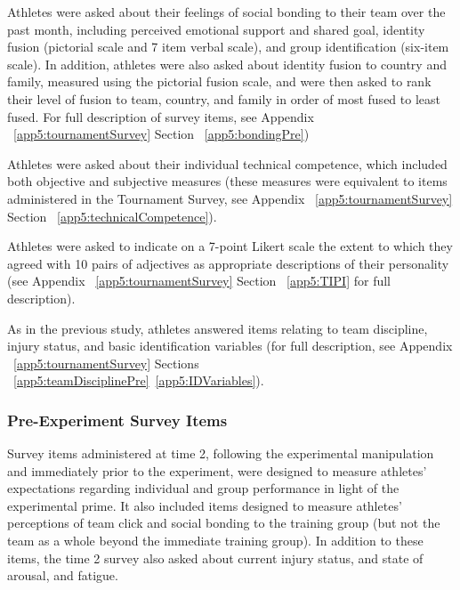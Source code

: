 Athletes were asked about their feelings of social bonding to their team over the past month, including perceived emotional support and shared goal, identity fusion (pictorial scale and 7 item verbal scale), and group identification (six-item scale).  In addition, athletes were also asked about identity fusion to country and family, measured using the pictorial fusion scale, and were then asked to rank their level of fusion to team, country, and family in order of most fused to least fused.  For full description of survey items, see Appendix ~\ref{app5:tournamentSurvey} Section ~\ref{app5:bondingPre})

Athletes were asked about their individual technical competence, which included both objective and subjective measures (these measures were equivalent to items administered in the Tournament Survey, see Appendix ~\ref{app5:tournamentSurvey} Section ~\ref{app5:technicalCompetence}).

Athletes were asked to indicate on a 7-point Likert scale the extent to which they agreed with 10 pairs of adjectives as appropriate descriptions of their personality (see Appendix ~\ref{app5:tournamentSurvey} Section ~\ref{app5:TIPI} for full description).

As in the previous study, athletes answered items relating to team discipline, injury status, and basic identification variables (for full description, see Appendix ~\ref{app5:tournamentSurvey} Sections ~\ref{app5:teamDisciplinePre}\nobreakdash~\ref{app5:IDVariables}).


\subsubsection{\label{app6:surveyItemsPre}Pre-Experiment Survey Items}
Survey items administered at time 2, following the experimental manipulation and immediately prior to the experiment, were designed to measure athletes' expectations regarding individual and group performance in light of the experimental prime. It also included items designed to measure athletes' perceptions of team click and social bonding to the training group (but not the team as a whole beyond the immediate training group).  In addition to these items, the time 2 survey also asked about current injury status, and state of arousal, and fatigue.


